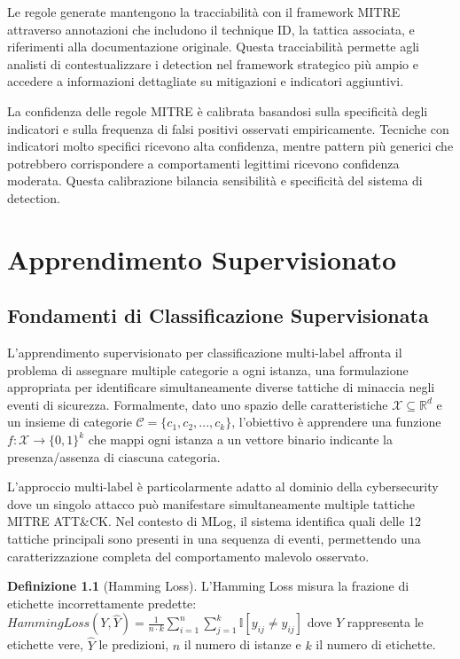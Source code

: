 \documentclass[12pt,a4paper]{report}
\theoremstyle{definition}
\newtheorem{definizione}{Definizione}[chapter]
\begin{document}
Le regole generate mantengono la tracciabilità con il framework MITRE attraverso annotazioni che includono il technique ID, la tattica associata, e riferimenti alla documentazione originale. Questa tracciabilità permette agli analisti di contestualizzare i detection nel framework strategico più ampio e accedere a informazioni dettagliate su mitigazioni e indicatori aggiuntivi.

La confidenza delle regole MITRE è calibrata basandosi sulla specificità degli indicatori e sulla frequenza di falsi positivi osservati empiricamente. Tecniche con indicatori molto specifici ricevono alta confidenza, mentre pattern più generici che potrebbero corrispondere a comportamenti legittimi ricevono confidenza moderata. Questa calibrazione bilancia sensibilità e specificità del sistema di detection.

\chapter{Apprendimento Supervisionato}

\section{Fondamenti di Classificazione Supervisionata}

L'apprendimento supervisionato per classificazione multi-label affronta il problema di assegnare multiple categorie a ogni istanza, una formulazione appropriata per identificare simultaneamente diverse tattiche di minaccia negli eventi di sicurezza. Formalmente, dato uno spazio delle caratteristiche $\mathcal{X} \subseteq \mathbb{R}^d$ e un insieme di categorie $\mathcal{C} = \{c_1, c_2, ..., c_k\}$, l'obiettivo è apprendere una funzione $f: \mathcal{X} \rightarrow \{0,1\}^k$ che mappi ogni istanza a un vettore binario indicante la presenza/assenza di ciascuna categoria.

L'approccio multi-label è particolarmente adatto al dominio della cybersecurity dove un singolo attacco può manifestare simultaneamente multiple tattiche MITRE ATT\&CK. Nel contesto di MLog, il sistema identifica quali delle 12 tattiche principali sono presenti in una sequenza di eventi, permettendo una caratterizzazione completa del comportamento malevolo osservato.

\begin{definizione}[Hamming Loss]
L'Hamming Loss misura la frazione di etichette incorrettamente predette:
$HammingLoss(Y, \hat{Y}) = \frac{1}{n \cdot k} \sum_{i=1}^{n} \sum_{j=1}^{k} \mathbb{I}[y_{ij} \neq \hat{y}_{ij}]$
dove $Y$ rappresenta le etichette vere, $\hat{Y}$ le predizioni, $n$ il numero di istanze e $k$ il numero di etichette.
\end{definizione}
\end{document}
